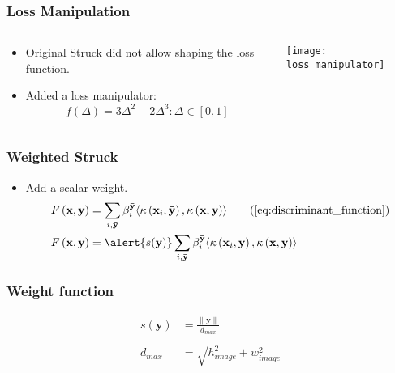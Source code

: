 \begin{frame}
    \frametitle{Loss Manipulation}
    \begin{columns}[T]
        \begin{column}{0.5\textwidth}
            \begin{itemize}
                \item Original Struck did not allow shaping the loss function.
                \item Added a loss manipulator:
                    \begin{equation}
                        f(\Delta) = 3\Delta^2 - 2\Delta^3 : \Delta \in [0, 1]
                    \end{equation}
            \end{itemize}
        \end{column}
        \begin{column}{0.5\textwidth}
            \texttt{[image: loss\_manipulator]}
        \end{column}
    \end{columns}
\end{frame}

\begin{frame}
    \frametitle{Weighted Struck}
    \begin{itemize}
        \item Add a scalar weight.
            \begin{align}
                F\left(\mathbf{x}, \mathbf{y}\right) &= \sum_{i, \mathbf{\bar{y}}} \beta_i^\mathbf{\bar{y}}
                    \langle \kappa\left(\mathbf{x}_i, \mathbf{\bar{y}}\right),
                    \kappa\left(\mathbf{x}, \mathbf{y}\right) \rangle
                    \tag{\ref{eq:discriminant_function}} \\
                F\left(\mathbf{x}, \mathbf{y}\right) &= \alert{s(\mathbf{y})} \sum_{i, \mathbf{\bar{y}}} \beta_i^\mathbf{\bar{y}}
                    \langle \kappa\left(\mathbf{x}_i, \mathbf{\bar{y}}\right),
                    \kappa\left(\mathbf{x}, \mathbf{y}\right) \rangle
            \end{align}
    \end{itemize}
\end{frame}

\begin{frame}
    \frametitle{Weight function}
    \begin{align}
        s \left( \mathbf{y} \right) &= \frac{\|\mathbf{y}\|}{d_{max}} \\
        \nonumber \\
        d_{max} &= \sqrt{h_{image}^2 + w_{image}^2}
    \end{align}
\end{frame}

